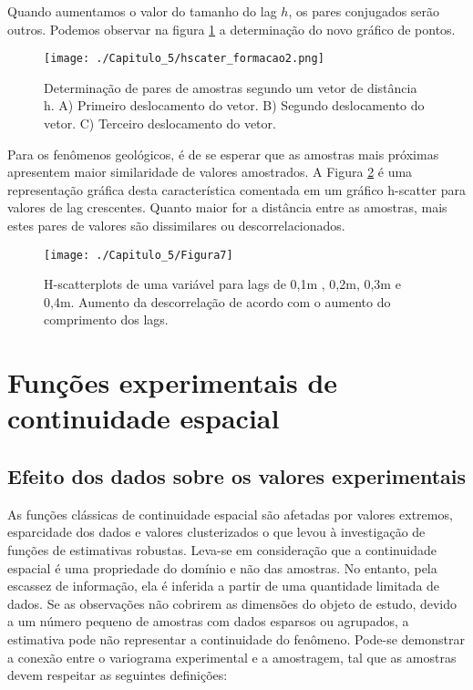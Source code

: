 Quando aumentamos o valor do tamanho do lag $h$, os pares conjugados serão outros. Podemos observar na figura \ref{pares_amostras2} a determinação do novo gráfico de pontos.

\FloatBarrier
\begin{figure}[!htb]
	\centering
	\texttt{[image: ./Capitulo\_5/hscater\_formacao2.png]}
	\caption{Determinação de pares de amostras segundo um vetor de distância h. A) Primeiro deslocamento do vetor. B) Segundo deslocamento do vetor. C) Terceiro deslocamento do vetor.}
	\label{pares_amostras2}
\end{figure}
\FloatBarrier


  Para os fenômenos geológicos, é de se esperar que as amostras mais próximas apresentem maior similaridade de valores amostrados. A Figura \ref{Figura7} é uma representação gráfica desta característica comentada em um gráfico h-scatter para valores de lag crescentes. Quanto maior for a distância entre as amostras, mais estes pares de valores são dissimilares ou descorrelacionados.  

\FloatBarrier
\begin{figure}[!htb]
	\centering
	\texttt{[image: ./Capitulo\_5/Figura7]}
	\caption{H-scatterplots de uma variável para lags de 0,1m , 0,2m, 0,3m e 0,4m. Aumento da descorrelação de acordo com o aumento do comprimento dos lags.}
	\label{Figura7}
\end{figure}
\FloatBarrier


\section{Funções experimentais de continuidade espacial}

\subsection{Efeito dos dados sobre os valores experimentais}

As funções clássicas de continuidade espacial são afetadas por valores extremos, esparcidade dos dados e valores clusterizados o que levou à investigação de funções de estimativas robustas. Leva-se em consideração que a continuidade espacial é uma propriedade do domínio e não das amostras. No entanto, pela escassez de informação, ela é inferida a partir de uma quantidade limitada de dados. Se as observações não cobrirem as dimensões do objeto de estudo, devido a um número pequeno de amostras com dados esparsos ou agrupados, a estimativa pode não representar a continuidade do fenômeno. Pode-se demonstrar a conexão entre o variograma experimental e a amostragem, tal que as amostras devem respeitar as seguintes definições:

